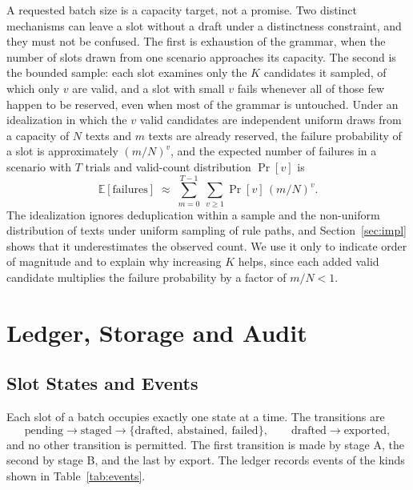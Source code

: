 \documentclass[11pt]{article}
\theoremstyle{definition}
\theoremstyle{remark}
\begin{document}
A requested batch size is a capacity target, not a promise. Two distinct mechanisms can leave a slot without a draft under a distinctness constraint, and they must not be confused. The first is exhaustion of the grammar, when the number of slots drawn from one scenario approaches its capacity. The second is the bounded sample: each slot examines only the $K$ candidates it sampled, of which only $v$ are valid, and a slot with small $v$ fails whenever all of those few happen to be reserved, even when most of the grammar is untouched. Under an idealization in which the $v$ valid candidates are independent uniform draws from a capacity of $N$ texts and $m$ texts are already reserved, the failure probability of a slot is approximately $(m/N)^{v}$, and the expected number of failures in a scenario with $T$ trials and valid-count distribution $\Pr[v]$ is
\[
\mathbb{E}[\mathrm{failures}]\;\approx\;\sum_{m=0}^{T-1}\ \sum_{v\ge1}\Pr[v]\,(m/N)^{v}.
\]
The idealization ignores deduplication within a sample and the non-uniform distribution of texts under uniform sampling of rule paths, and Section~\ref{sec:impl} shows that it underestimates the observed count. We use it only to indicate order of magnitude and to explain why increasing $K$ helps, since each added valid candidate multiplies the failure probability by a factor of $m/N<1$.

\section{Ledger, Storage and Audit}\label{sec:ledger}

\subsection{Slot States and Events}

Each slot of a batch occupies exactly one state at a time. The transitions are
\[
\text{pending}\to\text{staged}\to\{\text{drafted},\ \text{abstained},\ \text{failed}\},\qquad\text{drafted}\to\text{exported},
\]
and no other transition is permitted. The first transition is made by stage A, the second by stage B, and the last by export. The ledger records events of the kinds shown in Table~\ref{tab:events}.
\end{document}
